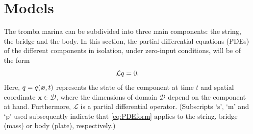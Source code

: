     \section{Models}\label{sec:models}
    The tromba marina can be subdivided into three main components: the string, the bridge and the body. In this section, the partial differential equations (PDEs) of the different components in isolation, under zero-input conditions, will be of the form
    \begin{equation}\label{eq:PDEform}
        \mathcal{L}q = 0.
    \end{equation}
    Here, $q = q(\boldsymbol{x},t)$ represents the state of the component at time $t$ and spatial coordinate $\boldsymbol{x}\in\mathcal{D}$, where the dimensions of domain $\mathcal{D}$ depend on the component at hand. Furthermore, $\mathcal{L}$ is a partial differential operator. (Subscripts `$\text{s}$', `$\text{m}$' and `$\text{p}$' used subsequently indicate that \eqref{eq:PDEform} applies to the string, bridge (mass) or body (plate), respectively.)
    
